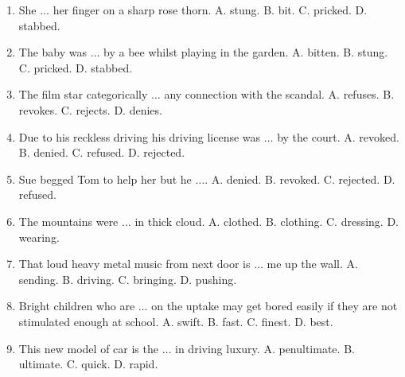\documentclass{article}
\numberwithin{equation}{section}
\begin{document}
\begin{enumerate}[leftmargin=8mm]
	\item She $\ldots$ her finger on a sharp rose thorn. {\sf A.} stung. {\sf B.} bit. {\sf C.} pricked. {\sf D.} stabbed.
	\item The baby was $\ldots$ by a bee whilst playing in the garden. {\sf A.} bitten. {\sf B.} stung. {\sf C.} pricked. {\sf D.} stabbed.
	\item The film star categorically $\ldots$ any connection with the scandal. {\sf A.} refuses. {\sf B.} revokes. {\sf C.} rejects. {\sf D.} denies.
	\item Due to his reckless driving his driving license was $\ldots$ by the court. {\sf A.} revoked. {\sf B.} denied. {\sf C.} refused. {\sf D.} rejected.
	\item Sue begged Tom to help her but he $\ldots$. {\sf A.} denied. {\sf B.} revoked. {\sf C.} rejected. {\sf D.} refused.
	\item The mountains were $\ldots$ in thick cloud. {\sf A.} clothed. {\sf B.} clothing. {\sf C.} dressing. {\sf D.} wearing.
	\item That loud heavy metal music from next door is $\ldots$ me up the wall. {\sf A.} sending. {\sf B.} driving. {\sf C.} bringing. {\sf D.} pushing.
	\item Bright children who are $\ldots$ on the uptake may get bored easily if they are not stimulated enough at school. {\sf A.} swift. {\sf B.} fast. {\sf C.} finest. {\sf D.} best.
	\item This new model of car is the $\ldots$ in driving luxury. {\sf A.} penultimate. {\sf B.} ultimate. {\sf C.} quick. {\sf D.} rapid.
\end{enumerate}


\printbibliography[heading=bibintoc]
	
\end{document}
